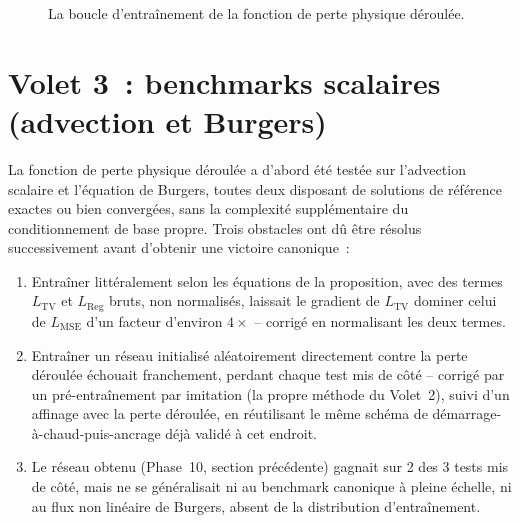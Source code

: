 \documentclass[11pt]{article}
\begin{document}
\begin{figure}[htbp]
\centering
{}
\caption{La boucle d'entraînement de la fonction de perte physique
déroulée.}
\end{figure}

\section{Volet 3~: benchmarks scalaires (advection et Burgers)}
\label{sec:volet3}

La fonction de perte physique déroulée a d'abord été testée sur
l'advection scalaire et l'équation de Burgers, toutes deux disposant de
solutions de référence exactes ou bien convergées, sans la complexité
supplémentaire du conditionnement de base propre. Trois obstacles ont dû
être résolus successivement avant d'obtenir une victoire canonique~:

\begin{enumerate}
    \item Entraîner littéralement selon les équations de la proposition,
    avec des termes $L_{\text{TV}}$ et $L_{\text{Reg}}$ bruts, non
    normalisés, laissait le gradient de $L_{\text{TV}}$ dominer celui de
    $L_{\text{MSE}}$ d'un facteur d'environ $4\times$ -- corrigé en
    normalisant les deux termes.
    \item Entraîner un réseau initialisé aléatoirement directement contre
    la perte déroulée échouait franchement, perdant chaque test mis de
    côté -- corrigé par un pré-entraînement par imitation (la propre
    méthode du Volet~2), suivi d'un affinage avec la perte déroulée, en
    réutilisant le même schéma de démarrage-à-chaud-puis-ancrage déjà
    validé à cet endroit.
    \item Le réseau obtenu (Phase~10, section précédente) gagnait sur 2
    des 3 tests mis de côté, mais ne se généralisait ni au benchmark
    canonique à pleine échelle, ni au flux non linéaire de Burgers, absent
    de la distribution d'entraînement.
\end{enumerate}
\end{document}
